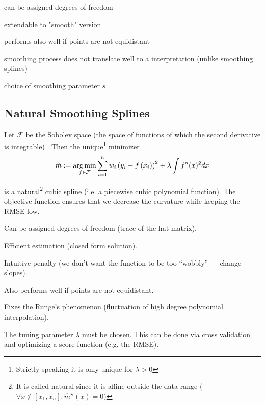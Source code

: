 		\begin{my_pros_cons_table}{
				\item can be assigned degrees of freedom
				\item extendable to "smooth" version
				\item performs also well if points are not equidistant
			}{
				\item smoothing process does not translate well to a interpretation (unlike smoothing splines)
				\item choice of smoothing parameter $s$
			}
		\end{my_pros_cons_table}


	\subsection{Natural Smoothing Splines}
		\label{sec:Natural_SS}
		Let $\mathcal F$ be the Sobolev space (the space of functions of which the second derivative is integrable) . Then the unique\footnote{Strictly speaking it is only unique for $\lambda > 0$} minimizer
		\begin{equation}
			\label{eq:ss}
			\hat m :=\operatorname*{arg\, min}_{f \in \mathcal F} \sum_{i=1}^{n}w_i\left(y_{i}-{f}\left(x_{i}\right)\right)^{2}+\lambda \int {f}^{\prime \prime}(x)^{2} dx
		\end{equation}
			
		is a natural\footnote{It is called natural since it is affine outside the data range ($\forall x\notin [x_1, x_n]:\hat m''(x) = 0$)} cubic spline (i.e. a piecewise cubic polynomial function).
		The objective function ensures that we decrease the curvature while keeping the RMSE low.


		\begin{my_pros_cons_table}{
				\item Can be assigned degrees of freedom (trace of the hat-matrix).
				\item Efficient estimation (closed form solution).
				\item Intuitive penalty (we don't want the function to be too ``wobbly'' --- change slopes).
				\item Also performs well if points are not equidistant.
				\item Fixes the Runge's phenomenon (fluctuation of high degree polynomial interpolation).
			}{
				\item The tuning parameter $\lambda$ must be chosen. This can be done via cross validation and optimizing a score function (e.g. the RMSE). 
			}
		\end{my_pros_cons_table}


